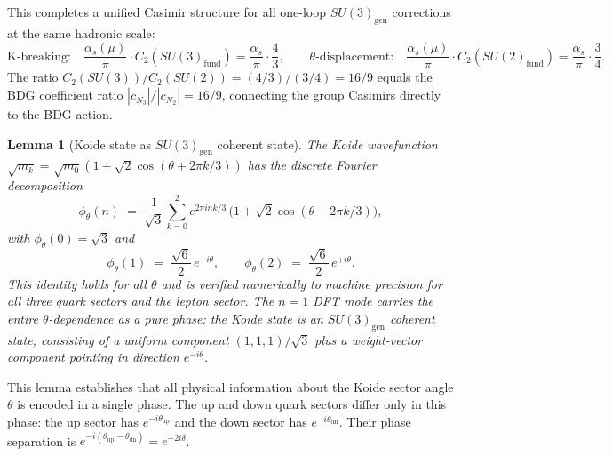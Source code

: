 \documentclass[11pt,a4paper]{article}
\newtheorem{lemma}[theorem]{Lemma}
\begin{document}
This completes a unified Casimir structure for all one-loop
$SU(3)_{\mathrm{gen}}$ corrections at the same hadronic scale:
\begin{equation}
  \text{K-breaking:}\quad
  \frac{\alpha_s(\mu)}{\pi}\cdot C_2\!\left(SU(3)_{\mathrm{fund}}\right)
  = \frac{\alpha_s}{\pi}\cdot\frac{4}{3},
  \qquad
  \text{$\theta$-displacement:}\quad
  \frac{\alpha_s(\mu)}{\pi}\cdot C_2\!\left(SU(2)_{\mathrm{fund}}\right)
  = \frac{\alpha_s}{\pi}\cdot\frac{3}{4}.
  \label{eq:casimir_pattern}
\end{equation}
The ratio $C_2(SU(3))/C_2(SU(2)) = (4/3)/(3/4) = 16/9$
equals the BDG coefficient ratio $|c_{N_3}|/|c_{N_2}| = 16/9$,
connecting the group Casimirs directly to the BDG action.

\begin{lemma}[Koide state as $SU(3)_{\mathrm{gen}}$ coherent state]
\label{lem:coherent}
The Koide wavefunction $\sqrt{m_k} = \sqrt{m_0}(1 + \sqrt{2}\cos(\theta
+ 2\pi k/3))$ has the discrete Fourier decomposition
\begin{equation}
  \phi_\theta(n) \;=\; \frac{1}{\sqrt{3}}\sum_{k=0}^2
  e^{2\pi ink/3}\,\bigl(1 + \sqrt{2}\cos(\theta+2\pi k/3)\bigr),
  \label{eq:koide_dft}
\end{equation}
with $\phi_\theta(0) = \sqrt{3}$ and
\begin{equation}
  \phi_\theta(1) \;=\; \frac{\sqrt{6}}{2}\,e^{-i\theta}, \qquad
  \phi_\theta(2) \;=\; \frac{\sqrt{6}}{2}\,e^{+i\theta}.
  \label{eq:koide_coherent}
\end{equation}
This identity holds for all $\theta$ and is verified numerically to
machine precision for all three quark sectors and the lepton sector.
The $n=1$ DFT mode carries the entire $\theta$-dependence as a pure
phase: the Koide state is an $SU(3)_{\mathrm{gen}}$ coherent state,
consisting of a uniform component $(1,1,1)/\sqrt{3}$ plus a
weight-vector component pointing in direction $e^{-i\theta}$.
\end{lemma}

This lemma establishes that all physical information about the Koide
sector angle $\theta$ is encoded in a single phase. The up and down
quark sectors differ only in this phase: the up sector has
$e^{-i\theta_{\mathrm{up}}}$ and the down sector has
$e^{-i\theta_{\mathrm{dn}}}$. Their phase separation is
$e^{-i(\theta_{\mathrm{up}}-\theta_{\mathrm{dn}})} = e^{-2i\delta}$.
\end{document}
